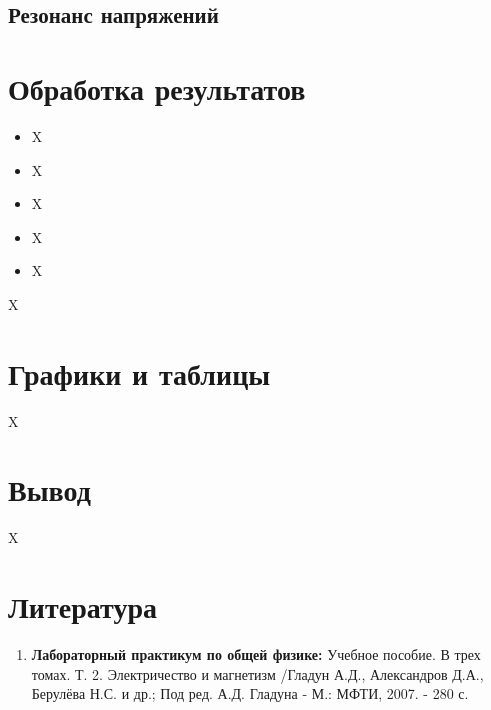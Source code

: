 \documentclass[a4paper, 12pt]{article}%
\begin{document}
\subsection{Резонанс напряжений}



\section{Обработка результатов}

\begin{itemize}

\item X

\item X

\item X

\item X

\item X

\end{itemize}

X

\section{Графики и таблицы}

X

\section{Вывод}

X

\section{Литература}

\begin{enumerate}
\item \textbf{Лабораторный практикум по общей физике:} Учебное пособие. В трех томах. Т. 2. Электричество и магнетизм /Гладун А.Д., Александров Д.А., Берулёва Н.С. и др.; Под ред. А.Д. Гладуна - М.: МФТИ, 2007. - 280 с.
\end{enumerate}		
		
					
\end{document}
